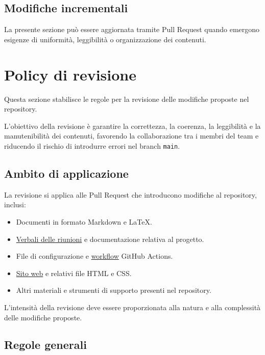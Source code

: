 \documentclass[11pt, a4paper]{article}
\begin{document}
\subsection{Modifiche incrementali}

La presente sezione può essere aggiornata tramite Pull Request quando emergono esigenze di uniformità, leggibilità o organizzazione dei contenuti.

\section{Policy di revisione}

Questa sezione stabilisce le regole per la revisione delle modifiche proposte nel repository.

L'obiettivo della revisione è garantire la correttezza, la coerenza, la leggibilità e la manutenibilità dei contenuti, favorendo la collaborazione tra i membri del team e riducendo il rischio di introdurre errori nel branch \texttt{main}.

\subsection{Ambito di applicazione}

La revisione si applica alle Pull Request che introducono modifiche al repository, inclusi:
\begin{itemize}
    \item Documenti in formato Markdown e LaTeX.
    \item \href{https://github.com/On-By-One-Team/On-By-One.github.io/tree/main/docs/pdf/verbali}{Verbali delle riunioni} e documentazione relativa al progetto.
    \item File di configurazione e \href{https://github.com/On-By-One-Team/On-By-One.github.io/blob/main/.github/workflows}{workflow} GitHub Actions.
    \item \href{https://on-by-one-team.github.io/On-By-One.github.io/}{Sito web} e relativi file HTML e CSS.
    \item Altri materiali e strumenti di supporto presenti nel repository.
\end{itemize}

\noindent L'intensità della revisione deve essere proporzionata alla natura e alla complessità delle modifiche proposte.

\subsection{Regole generali}
\label{subsec:regole-generali}
\end{document}
